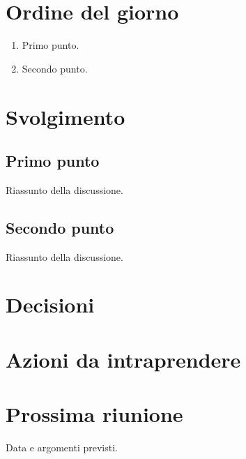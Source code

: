 \section{Ordine del giorno}
\begin{enumerate}
  \item Primo punto.
  \item Secondo punto.
\end{enumerate}

\section{Svolgimento}
\subsection{Primo punto}
Riassunto della discussione.

\subsection{Secondo punto}
Riassunto della discussione.

\section{Decisioni}
\begin{decisioni}
\end{decisioni}

\section{Azioni da intraprendere}
\begin{azioni}
\end{azioni}

\section{Prossima riunione}
Data e argomenti previsti.


